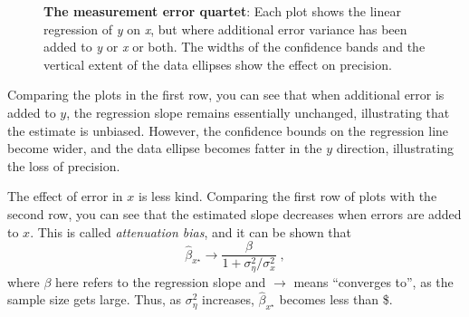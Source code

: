 \documentclass[
  letterpaper,
  10pt,
  krantz2]{krantz}
\begin{document}
\begin{figure}[H]


\caption{\label{fig-measerr-demo}\textbf{The measurement error quartet}:
Each plot shows the linear regression of \emph{y} on \emph{x}, but where
additional error variance has been added to \emph{y} or \emph{x} or
both. The widths of the confidence bands and the vertical extent of the
data ellipses show the effect on precision.}

\end{figure}%

Comparing the plots in the first row, you can see that when additional
error is added to \(y\), the regression slope remains essentially
unchanged, illustrating that the estimate is unbiased. However, the
confidence bounds on the regression line become wider, and the data
ellipse becomes fatter in the \(y\) direction, illustrating the loss of
precision.

The effect of error in \(x\) is less kind. Comparing the first row of
plots with the second row, you can see that the estimated slope
decreases when errors are added to \(x\). This is called
\emph{attenuation bias}, and it can be shown that \[
\widehat{\beta}_{x^\star} \longrightarrow \frac{\beta}{1+\sigma^2_\eta /\sigma^2_x} \; ,
\] where \(\beta\) here refers to the regression slope and
\(\longrightarrow\) means ``converges to'', as the sample size gets
large. Thus, as \(\sigma^2_\eta\) increases,
\(\widehat{\beta}_{x^\star}\) becomes less than \beta\$.
\end{document}
